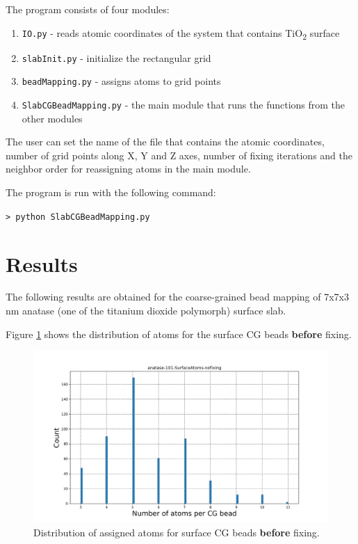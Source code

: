 \documentclass[11pt]{article}
\begin{document}
The program consists of four modules:

\begin{enumerate}
\item \texttt{IO.py} - reads atomic coordinates of the system that contains TiO\textsubscript{2} surface
\item \texttt{slabInit.py} - initialize the rectangular grid
\item \texttt{beadMapping.py} - assigns atoms to grid points
\item \texttt{SlabCGBeadMapping.py} - the main module that runs the functions from the other modules
\end{enumerate}

The user can set the name of the file that contains the atomic coordinates, number of grid points along X, Y and Z axes, number of fixing iterations and the neighbor order for reassigning atoms in the main module. 

The program is run with the following command:

\texttt{> python SlabCGBeadMapping.py}

\section{Results}

The following results are obtained for the coarse-grained bead mapping of 7x7x3 nm anatase (one of the titanium dioxide polymorph) surface slab.

Figure \ref{fig: anatase-101 histogram unfixed} shows the distribution of atoms for the surface CG beads \textbf{before} fixing.

\begin{figure}[h]
\centering
\includegraphics[scale=0.3]{anatase-101-SurfaceAtoms-nofixing.png}
\caption{Distribution of assigned atoms for surface CG beads \textbf{before} fixing.}
\label{fig: anatase-101 histogram unfixed}
\end{figure}
\end{document}
